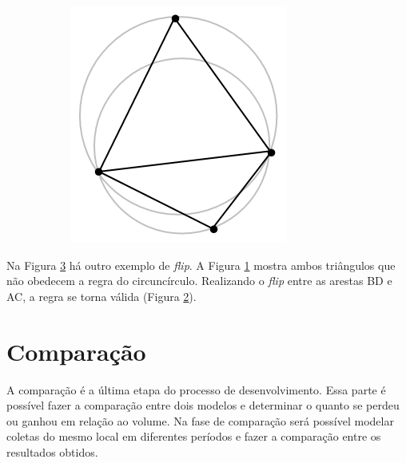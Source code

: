 \begin{figure}[H]
\begin{subfigure}[t]{0.27\textwidth}
        \caption{}
        \label{fig:delaunay_theorem2}
    \end{subfigure}
    \hspace{2em}
    \begin{subfigure}[t]{0.2\textwidth}
        \includegraphics[width=\textwidth]{dados/figuras/delaunay_theorem3.png}
        \caption{}
        \label{fig:delaunay_theorem3}
    \end{subfigure}
    \label{fig:delaunay_theorem}
\end{figure}

Na Figura \ref{fig:delaunay_theorem} há outro exemplo de \textit{flip}. A Figura \ref{fig:delaunay_theorem2} mostra ambos triângulos que não obedecem a regra do circuncírculo. Realizando o \textit{flip} entre as arestas BD e AC, a regra se torna válida (Figura \ref{fig:delaunay_theorem3}). 


\section{Comparação}
\label{sec:comparacao}

A comparação é a última etapa do processo de desenvolvimento. Essa parte é possível fazer a comparação entre dois modelos e determinar o quanto se perdeu ou ganhou em relação ao volume. Na fase de comparação será possível modelar coletas do mesmo local em diferentes períodos e fazer a comparação entre os resultados obtidos.



